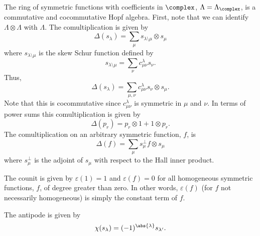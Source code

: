 \documentclass[fleqn]{NotesClass}
\begin{document}
    The ring of symmetric functions with coefficients in \(\complex\), \(\Lambda = \Lambda_{\complex}\), is a commutative and cocommutative Hopf algebra.
    First, note that we can identify \(\Lambda \otimes \Lambda\) with \(\Lambda\).
    The comultiplication is given by
    \begin{equation}
        \Delta(s_\lambda) = \sum_{\mu} s_{\lambda\setminus \mu} \otimes s_\mu
    \end{equation}
    where \(s_{\lambda \setminus \mu}\) is the skew Schur function defined by
    \begin{equation}
        s_{\lambda \setminus \mu} = \sum_\nu c^\lambda_{\mu\nu} s_\nu.
    \end{equation}
    Thus,
    \begin{equation}
        \Delta(s_\lambda) = \sum_{\mu, \nu} c^\lambda_{\mu\nu} s_{\nu} \otimes s_\mu.
    \end{equation}
    Note that this is cocommutative since \(c^\lambda_{\mu\nu}\) is symmetric in \(\mu\) and \(\nu\).
    In terms of power sums this comultiplication is given by
    \begin{equation}
        \Delta(p_r) = p_r \otimes 1 + 1 \otimes p_r.
    \end{equation}
    The comultiplication on an arbitrary symmetric function, \(f\), is
    \begin{equation}
        \Delta(f) = \sum_\mu s_\mu^{\perp} f \otimes s_\mu
    \end{equation}
    where \(s_\mu^{\perp}\) is the adjoint of \(s_\mu\) with respect to the Hall inner product.
    
    The counit is given by \(\varepsilon(1) = 1\) and \(\varepsilon(f) = 0\) for all homogeneous symmetric functions, \(f\), of degree greater than zero.
    In other words, \(\varepsilon(f)\) (for \(f\) not necessarily homogeneous) is simply the constant term of \(f\).
    
    The antipode is given by
    \begin{equation}
        \chi(s_\lambda) = (-1)^{\abs{\lambda}} s_{\lambda'}.
    \end{equation}
    
\end{document}

